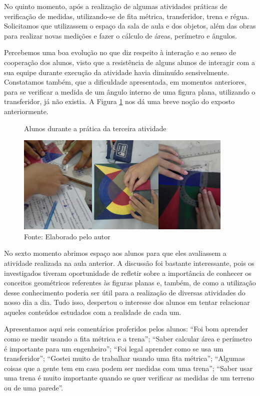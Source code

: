 \begin{refsection}
    No quinto momento, após a realização de algumas atividades práticas de verificação de medidas, utilizando-se de fita métrica, transferidor, trena e régua. Solicitamos que utilizassem o espaço da sala de aula e dos objetos, além das obras para realizar novas medições e fazer o cálculo de áreas, perímetro e ângulos. 

    Percebemos uma boa evolução no que diz respeito à interação e ao senso de cooperação dos alunos, visto que a resistência de alguns alunos de interagir com a sua equipe durante execução da atividade havia diminuído sensivelmente. Constatamos também, que a dificuldade apresentada, em momentos anteriores, para se verificar a medida de um ângulo interno de uma figura plana, utilizando o transferidor, já não existia. A Figura \ref{fig:alunos-durante-3a-pratica} nos dá uma breve noção do exposto anteriormente. 

    \begin{figure}[ht]%
        \centering%
        \caption{Alunos durante a prática da terceira atividade}%
        \includegraphics[width=.80\textwidth]{articles/04-matematica-na-arte--/figura8.jpg}%
        \caption*{Fonte: Elaborado pelo autor}%
        \label{fig:alunos-durante-3a-pratica}%
    \end{figure}%

    No sexto momento abrimos espaço aos alunos para que eles avaliassem a atividade realizada na aula anterior. A discussão foi bastante interessante, pois os investigados tiveram oportunidade de refletir sobre a importância de conhecer os conceitos geométricos referentes às figuras planas e, também, de como a utilização desse conhecimento poderia ser útil para a realização de diversas atividades do nosso dia a dia. Tudo isso, despertou o interesse dos alunos em tentar relacionar aqueles conteúdos estudados com a realidade de cada um.  

    Apresentamos aqui seis comentários proferidos pelos alunos: “Foi bom aprender como se medir usando a fita métrica e a trena”; “Saber calcular área e perímetro é importante para um engenheiro”; “Foi legal aprender como se usa um transferidor”; “Gostei muito de trabalhar usando uma fita métrica”; “Algumas coisas que a gente tem em casa podem ser medidas com uma trena”; “Saber usar uma trena é muito importante quando se quer verificar as medidas de um terreno ou de uma parede”. 


\end{refsection}

